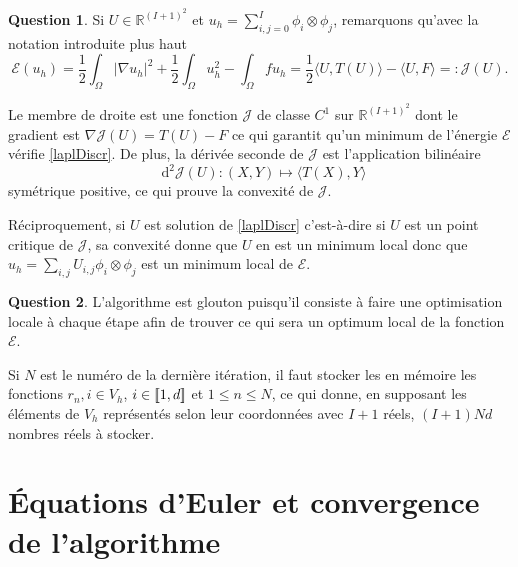 \documentclass[11pt]{article}
\newcommand{\dif}[1][{}]{\mathop{}\!\mathrm{d}^{#1}}
\newcommand{\RR}{\mathbb{R}}
\DeclarePairedDelimiter{\zintcc}{[\![}{]\!]}
\theoremstyle{definition}
\newtheorem{ques}{Question}
\begin{document}
\begin{ques}
Si $U\in \RR^{(I+1)^2}$ et $u_h = \sum_{i,j=0}^I\phi_i\otimes\phi_j$, remarquons qu'avec la notation introduite plus haut
\[
\mathcal{E}(u_h) = \frac 12\int_\Omega |\nabla u_h|^2 + \frac 12\int_\Omega u_h^2 - \int_\Omega fu_h = \frac 12\langle U,T(U)\rangle - \langle U,F\rangle =: \mathcal J(U).
\]

Le membre de droite est une fonction $\mathcal J$ de classe $C^1$ sur $\RR^{(I+1)^2}$ dont le gradient est $\nabla \mathcal J(U) = T(U) - F$ ce qui garantit qu'un minimum de l'énergie $\mathcal E$ vérifie \eqref{laplDiscr}. De plus, la dérivée seconde de $\mathcal J$ est l'application bilinéaire
\[
\dif[2]\mathcal J(U):(X,Y)\longmapsto \langle T(X),Y\rangle
\]
symétrique positive, ce qui prouve la convexité de $\mathcal J$.

Réciproquement, si $U$ est solution de \eqref{laplDiscr} c'est-à-dire si $U$ est un point critique de $\mathcal J$, sa convexité donne que $U$ en est un minimum local donc que $u_h = \sum_{i,j}U_{i,j}\phi_i\otimes\phi_j$ est un minimum local de $\mathcal E$.
\end{ques}


\begin{ques}
L'algorithme est glouton puisqu'il consiste à faire une optimisation locale à chaque étape afin de trouver ce qui sera un optimum local de la fonction $\mathcal E$.

Si $N$ est le numéro de la dernière itération, il faut stocker les en mémoire les fonctions $r_n,i\in V_h$, $i\in\zintcc{1,d}$ et $1\leq n\leq N$, ce qui donne, en supposant les éléments de $V_h$ représentés selon leur coordonnées avec $I+1$ réels, $(I+1)Nd$ nombres réels à stocker.
\end{ques}



\section{Équations d'Euler et convergence de l'algorithme}
\end{document}
